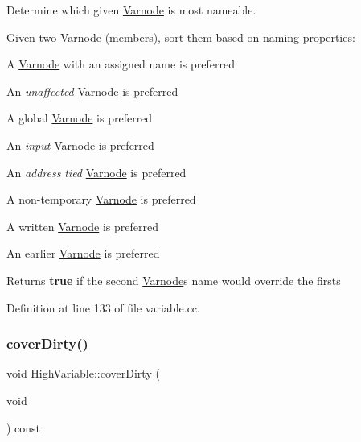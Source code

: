 Determine which given \mbox{\hyperlink{class_varnode}{Varnode}} is most nameable. 

Given two \mbox{\hyperlink{class_varnode}{Varnode}} (members), sort them based on naming properties\+:
\begin{DoxyItemize}
\item A \mbox{\hyperlink{class_varnode}{Varnode}} with an assigned name is preferred
\item An {\itshape unaffected} \mbox{\hyperlink{class_varnode}{Varnode}} is preferred
\item A global \mbox{\hyperlink{class_varnode}{Varnode}} is preferred
\item An {\itshape input} \mbox{\hyperlink{class_varnode}{Varnode}} is preferred
\item An {\itshape address} {\itshape tied} \mbox{\hyperlink{class_varnode}{Varnode}} is preferred
\item A non-\/temporary \mbox{\hyperlink{class_varnode}{Varnode}} is preferred
\item A written \mbox{\hyperlink{class_varnode}{Varnode}} is preferred
\item An earlier \mbox{\hyperlink{class_varnode}{Varnode}} is preferred
\end{DoxyItemize}

\begin{DoxyReturn}{Returns}
{\bfseries{true}} if the second \mbox{\hyperlink{class_varnode}{Varnode}}\textquotesingle{}s name would override the first\textquotesingle{}s 
\end{DoxyReturn}


Definition at line 133 of file variable.\+cc.

\mbox{\label{class_high_variable_abfccefe09b47f44250284e3fae328cb5}} 
\subsubsection{\texorpdfstring{coverDirty()}{coverDirty()}}
{\footnotesize\ttfamily void High\+Variable\+::cover\+Dirty (\begin{DoxyParamCaption}\item[{void}]{ }\end{DoxyParamCaption}) const\hspace{0.3cm}{\ttfamily [inline]}}




